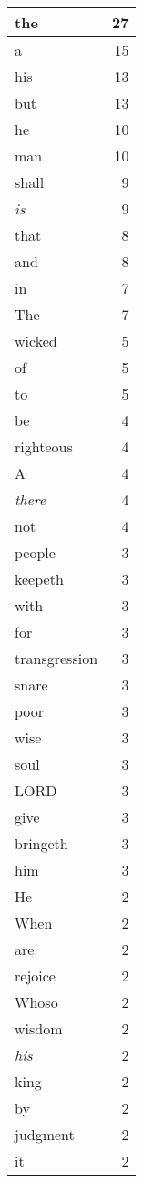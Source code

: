 \begin{center}
\begin{longtable}{l|r}
the & 27\\ \hline 
a & 15\\ \hline 
his & 13\\ \hline 
but & 13\\ \hline 
he & 10\\ \hline 
man & 10\\ \hline 
shall & 9\\ \hline 
\emph{is} & 9\\ \hline 
that & 8\\ \hline 
and & 8\\ \hline 
in & 7\\ \hline 
The & 7\\ \hline 
wicked & 5\\ \hline 
of & 5\\ \hline 
to & 5\\ \hline 
be & 4\\ \hline 
righteous & 4\\ \hline 
A & 4\\ \hline 
\emph{there} & 4\\ \hline 
not & 4\\ \hline 
people & 3\\ \hline 
keepeth & 3\\ \hline 
with & 3\\ \hline 
for & 3\\ \hline 
transgression & 3\\ \hline 
snare & 3\\ \hline 
poor & 3\\ \hline 
wise & 3\\ \hline 
soul & 3\\ \hline 
LORD & 3\\ \hline 
give & 3\\ \hline 
bringeth & 3\\ \hline 
him & 3\\ \hline 
He & 2\\ \hline 
When & 2\\ \hline 
are & 2\\ \hline 
rejoice & 2\\ \hline 
Whoso & 2\\ \hline 
wisdom & 2\\ \hline 
\emph{his} & 2\\ \hline 
king & 2\\ \hline 
by & 2\\ \hline 
judgment & 2\\ \hline 
it & 2\\ \hline 

\end{longtable}
\end{center}
